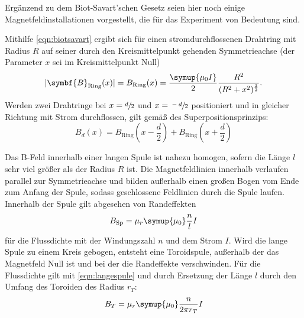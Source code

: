 Ergänzend zu dem Biot-Savart'schen Gesetz seien hier noch einige Magnetfeldinstallationen vorgestellt, die für das Experiment 
von Bedeutung sind.

Mithilfe \eqref{eqn:biotsavart} ergibt sich für einen stromdurchflossenen Drahtring mit Radius $R$ auf seiner durch den Kreismittelpunkt 
gehenden Symmetrieachse (der Parameter $x$ sei im Kreismittelpunkt Null)
\begin{equation}
    \lvert\symbf{B}_\text{Ring}(x)\rvert = B_\text{Ring}(x) = \frac{\symup{\mu_0 I}}{2} \frac{R^2}{(R^2 + x^2)^{\frac{3}{2}}}.
    \label{eqn:ring}
\end{equation}
Werden zwei Drahtringe bei $x=\sfrac{d}{2}$ und $x=\sfrac{-d}{2}$ positioniert und in gleicher Richtung mit Strom durchflossen,
gilt gemäß des Superpositionsprinzips: 
\begin{equation}
    B_d(x)=B_\text{Ring}(x-\frac{d}{2}) + B_\text{Ring}(x+\frac{d}{2})
    \label{eqn:2ringe}
\end{equation}

Das B-Feld innerhalb einer langen Spule ist nahezu homogen, sofern die Länge $l$ sehr viel größer als der Radius $R$ ist. 
Die Magnetfeldlinien innerhalb verlaufen parallel zur Symmetrieachse und bilden außerhalb einen großen 
Bogen vom Ende zum Anfang der Spule, sodass geschlossene Feldlinien durch die Spule laufen.
Innerhalb der Spule gilt abgesehen von Randeffekten 
\begin{equation}
    B_\text{Sp} = \mu_r \symup{\mu_0} \frac{n}{l} I
    \label{eqn:langespule}
\end{equation}
für die Flussdichte mit der Windungszahl $n$ und dem Strom $I$. 
Wird die lange Spule zu einem Kreis gebogen, entsteht eine Toroidspule, außerhalb der das Magnetfeld Null ist und bei der 
die Randeffekte verschwinden. 
Für die Flussdichte gilt mit \eqref{eqn:langespule} und durch Ersetzung der Länge $l$ durch den Umfang des Toroiden des Radius $r_T$:
\begin{equation}
    B_T=\mu_r \symup{\mu_0} \frac{n}{2 \pi r_T} I
    \label{eqn:toroid}
\end{equation}
